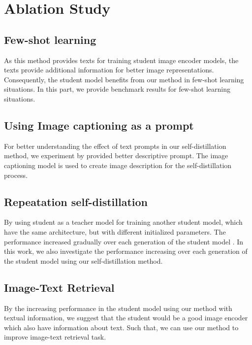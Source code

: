 \section{Ablation Study}
\subsection{Few-shot learning}
As this method provides texts for training student image encoder models, the texts provide additional information for better image representations.
Consequently, the student model benefits from our method in few-shot learning situations.
In this part, we provide benchmark results for few-shot learning situations.

\subsection{Using Image captioning as a prompt}
For better understanding the effect of text prompts in our self-distillation method, we experiment by provided better descriptive prompt.
The image captioning model is used to create image description for the self-distillation process.

\subsection{Repeatation self-distillation}
By using student as a teacher model for training another student model, which have the same architecture, but with different initialized parameters.
The performance increased gradually over each generation of the student model .
In this work, we also investigate the performance increasing over each generation of the student model using our self-distillation method.

\subsection{Image-Text Retrieval}
By the increasing performance in the student model using our method with textual information, we suggest that the student would be a good image encoder which also have information about text.
Such that, we can use our method to improve image-text retrieval task.


